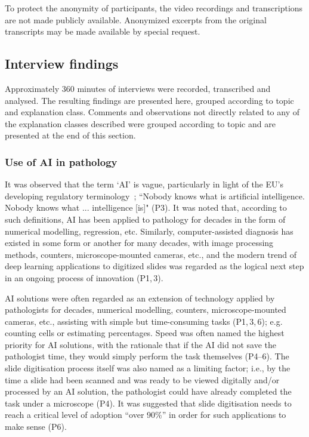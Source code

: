 \documentclass[final,5p,times,twocolumn,hyphens]{elsarticle}
\begin{document}
To protect the anonymity of participants, the video recordings and transcriptions are not made publicly available. Anonymized excerpts from the original transcripts may be made available by special request.

\subsection{Interview findings}

Approximately 360 minutes of interviews were recorded, transcribed and analysed. The resulting findings are presented here, grouped according to topic and explanation class. Comments and observations not directly related to any of the explanation classes described were grouped according to topic and are presented at the end of this section.

\subsubsection{Use of AI in pathology}

It was observed that the term `AI' is vague,  particularly in light of the EU's developing regulatory terminology~\cite{ISO_IEC_22989}; ``Nobody knows what is artificial intelligence. Nobody knows what ... intelligence [is]" (P3). It was noted that, according to such definitions, AI has been applied to pathology for decades in the form of numerical modelling, regression, etc. Similarly, computer-assisted diagnosis has existed in some form or another for many decades, with image processing methods, counters, microscope-mounted cameras, etc., and the modern trend of deep learning applications to digitized slides was regarded as the logical next step in an ongoing process of innovation (P1,\,3).

AI solutions were often regarded as an extension of technology applied by pathologists for decades, numerical modelling, counters, microscope-mounted cameras, etc., assisting with simple but time-consuming tasks (P1,\,3,\,6); e.g. counting cells or estimating percentages. Speed was often named the highest priority for AI solutions, with the rationale that if the AI did not save the pathologist time, they would simply perform the task themselves (P4--6). The slide digitisation process itself was also named as a limiting factor; i.e., by the time a slide had been scanned and was ready to be viewed digitally and/or processed by an AI solution, the pathologist could have already completed the task under a microscope (P4). It was suggested that slide digitisation needs to reach a critical level of adoption ``over 90\%'' in order for such applications to make sense (P6).
\end{document}

